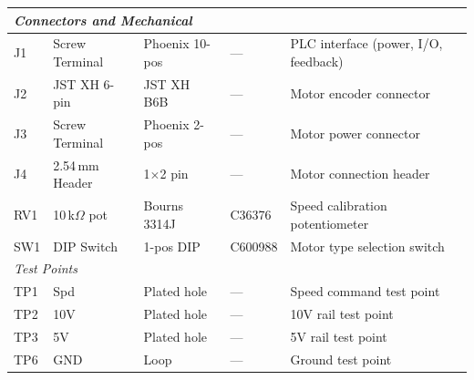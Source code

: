 \documentclass[main.tex]{subfiles}
\begin{document}
\begin{longtable}{l l l l p{4.2cm}}
\multicolumn{5}{l}{\textit{Connectors and Mechanical}} \\
\hline
J1 & Screw Terminal & Phoenix 10-pos & --- & PLC interface (power, I/O, feedback) \\
J2 & JST XH 6-pin & JST XH B6B & --- & Motor encoder connector \\
J3 & Screw Terminal & Phoenix 2-pos & --- & Motor power connector \\
J4 & 2.54\,mm Header & 1$\times$2 pin & --- & Motor connection header \\
RV1 & 10\,k$\Omega$ pot & Bourns 3314J & C36376 & Speed calibration potentiometer \\
SW1 & DIP Switch & 1-pos DIP & C600988 & Motor type selection switch \\
\hline

\multicolumn{5}{l}{\textit{Test Points}} \\
\hline
TP1 & Spd & Plated hole & --- & Speed command test point \\
TP2 & 10V & Plated hole & --- & 10V rail test point \\
TP3 & 5V & Plated hole & --- & 5V rail test point \\
TP6 & GND & Loop & --- & Ground test point \\

\end{longtable}
\renewcommand{\arraystretch}{1}
\end{document}
